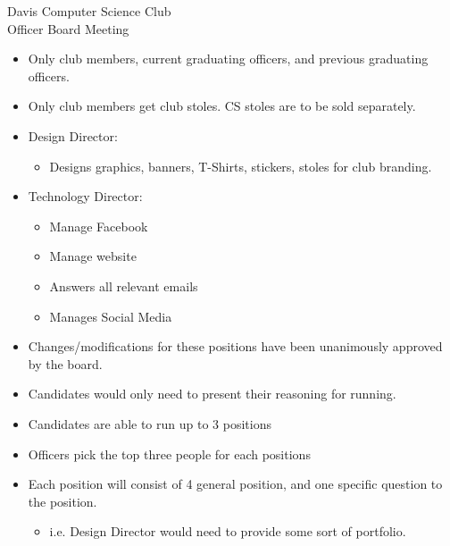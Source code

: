 \documentclass{article}
\begin{document}
\begin{Minutes}{Davis Computer Science Club\\Officer Board Meeting}
\begin{itemize}
    \item Only club members, current graduating officers, and previous graduating officers.
	\item Only club members get club stoles. CS stoles are to be sold separately.
\end{itemize}

\begin{itemize}
    \item Design Director:
    \begin{itemize}
    		\item Designs graphics, banners, T-Shirts, stickers, stoles for club branding.
    \end{itemize}
    \item Technology Director:
    \begin{itemize}
    		\item Manage Facebook
    		\item Manage website
    		\item Answers all relevant emails
    		\item Manages Social Media
    \end{itemize}
   	
   	\item Changes/modifications for these positions have been unanimously approved by the board. 
\end{itemize}

\begin{itemize}
    \item Candidates would only need to present their reasoning for running.
    \item Candidates are able to run up to 3 positions
    \item Officers pick the top three people for each positions
    \item Each position will consist of 4 general position, and one specific question to the position.
    \begin{itemize}
    		\item i.e. Design Director would need to provide some sort of portfolio. 
    \end{itemize}
\end{itemize}

\thispagestyle{creditfooter}

\end{Minutes}
\end{document}
